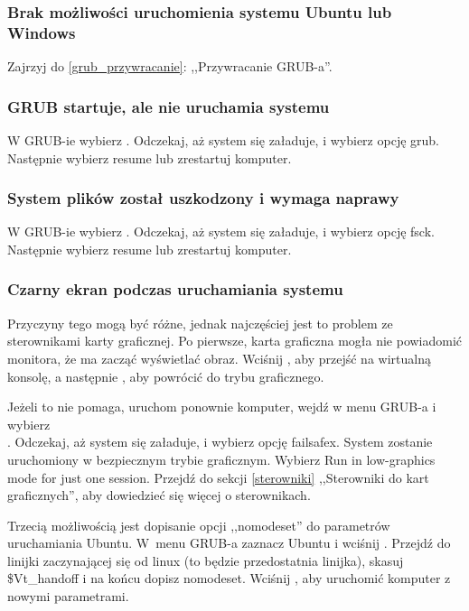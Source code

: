 \label{rozwiązywanie problemów}
\subsubsection{Brak możliwości uruchomienia systemu Ubuntu lub Windows}
Zajrzyj do \ref{grub_przywracanie}: ,,Przywracanie GRUB-a''.

\subsubsection{GRUB startuje, ale nie uruchamia systemu}
W GRUB-ie wybierz . Odczekaj, aż system się załaduje, i wybierz opcję \textcolor{ubuntu_orange}{grub}. Następnie wybierz \textcolor{ubuntu_orange}{resume} lub zrestartuj komputer.

\subsubsection{System plików został uszkodzony i wymaga naprawy}
W GRUB-ie wybierz . Odczekaj, aż system się załaduje, i wybierz opcję \textcolor{ubuntu_orange}{fsck}. Następnie wybierz \textcolor{ubuntu_orange}{resume} lub zrestartuj komputer.

\subsubsection{Czarny ekran podczas uruchamiania systemu}
Przyczyny tego mogą być różne, jednak najczęściej jest to problem ze sterownikami karty graficznej. Po pierwsze, karta graficzna mogła nie powiadomić monitora, że ma zacząć wyświetlać obraz. Wciśnij , aby przejść na wirtualną konsolę, a następnie , aby powrócić do trybu graficznego.

Jeżeli to nie pomaga, uruchom ponownie komputer, wejdź w menu GRUB-a i wybierz\\
. Odczekaj, aż system się załaduje, i wybierz opcję \textcolor{ubuntu_orange}{failsafex}. System zostanie uruchomiony w bezpiecznym trybie graficznym. Wybierz \textcolor{ubuntu_orange}{Run in low-graphics mode for just one session}. Przejdź do sekcji \ref{sterowniki} ,,Sterowniki do kart graficznych'', aby dowiedzieć się więcej o sterownikach.

Trzecią możliwością jest dopisanie opcji ,,nomodeset'' do parametrów uruchamiania Ubuntu. W~menu GRUB-a zaznacz Ubuntu i wciśnij . Przejdź do linijki zaczynającej się od \textcolor{ubuntu_orange}{linux}	(to będzie przedostatnia linijka), skasuj \$Vt\_handoff i na końcu dopisz \textcolor{ubuntu_orange}{nomodeset}. Wciśnij , aby uruchomić komputer z nowymi parametrami.

